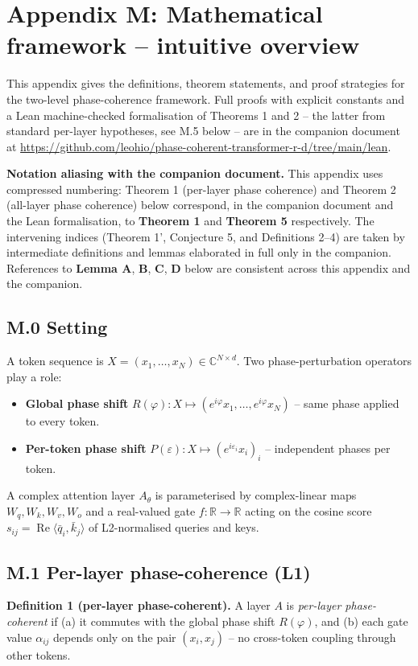 \documentclass[11pt,a4paper]{article}
\theoremstyle{plain}
\theoremstyle{definition}
\renewcommand{\Re}{\operatorname{Re}}
\begin{document}
\medskip

\section*{Appendix M: Mathematical framework -- intuitive overview}
This appendix gives the definitions, theorem statements, and proof strategies for the two-level phase-coherence framework. Full proofs with explicit constants and a Lean machine-checked formalisation of Theorems 1 and 2 -- the latter from standard per-layer hypotheses, see M.5 below -- are in the companion document at \url{https://github.com/leohio/phase-coherent-transformer-r-d/tree/main/lean}.

\textbf{Notation aliasing with the companion document.} This appendix uses compressed numbering: Theorem 1 (per-layer phase coherence) and Theorem 2 (all-layer phase coherence) below correspond, in the companion document and the Lean formalisation, to \textbf{Theorem 1} and \textbf{Theorem 5} respectively. The intervening indices (Theorem 1', Conjecture 5, and Definitions 2--4) are taken by intermediate definitions and lemmas elaborated in full only in the companion. References to \textbf{Lemma A}, \textbf{B}, \textbf{C}, \textbf{D} below are consistent across this appendix and the companion.

\subsection*{M.0 Setting}
A token sequence is $X = (x_1, \dots, x_N) \in \mathbb{C}^{N\times d}$. Two phase-perturbation operators play a role:

\begin{itemize}
  \item \textbf{Global phase shift} $R(\varphi): X \mapsto (e^{i\varphi}x_1, \dots, e^{i\varphi}x_N)$ -- same phase applied to every token.
  \item \textbf{Per-token phase shift} $P(\varepsilon): X \mapsto (e^{i\varepsilon_i} x_i)_i$ -- independent phases per token.
\end{itemize}

A complex attention layer $A_\theta$ is parameterised by complex-linear maps $W_q, W_k, W_v, W_o$ and a real-valued gate $f: \mathbb{R} \to \mathbb{R}$ acting on the cosine score $s_{ij} = \Re\langle \bar{q}_i, \bar{k}_j\rangle$ of L2-normalised queries and keys.

\subsection*{M.1 Per-layer phase-coherence (L1)}
\textbf{Definition 1 (per-layer phase-coherent).} A layer $A$ is \emph{per-layer phase-coherent} if (a) it commutes with the global phase shift $R(\varphi)$, and (b) each gate value $\alpha_{ij}$ depends only on the pair $(x_i, x_j)$ -- no cross-token coupling through other tokens.
\end{document}
